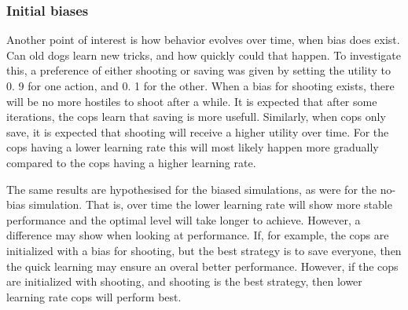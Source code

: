 \subsubsection{Initial biases}
Another point of interest is how behavior evolves over time, when bias does exist.
Can old dogs learn new tricks, and how quickly could that happen.
To investigate this, a preference of either shooting or saving was given by setting the utility to 0.
9 for one action, and 0.
1 for the other.
When a bias for shooting exists, there will be no more hostiles to shoot after a while.
It is expected that after some iterations, the cops learn that saving is more usefull.
Similarly, when cops only save, it is expected that shooting will receive a higher utility over time.
For the cops having a lower learning rate this will most likely happen more gradually compared to the cops having a higher learning rate.


The same results are hypothesised for the biased simulations, as were for the no-bias simulation.
That is, over time the lower learning rate will show more stable performance and the optimal level will take longer to achieve.
However, a difference may show when looking at performance.
If, for example, the cops are initialized with a bias for shooting, but the best strategy is to save everyone, then the quick learning may ensure an overal better performance.
However, if the cops are initialized with shooting, and shooting is the best strategy, then lower learning rate cops will perform best.

